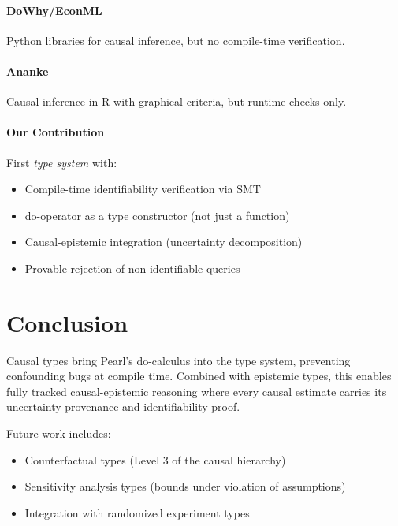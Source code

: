\documentclass[11pt]{article}
\begin{document}
\paragraph{DoWhy/EconML} Python libraries for causal inference, but no compile-time verification.

\paragraph{Ananke} Causal inference in R with graphical criteria, but runtime checks only.

\paragraph{Our Contribution} First \emph{type system} with:
\begin{itemize}
\item Compile-time identifiability verification via SMT
\item do-operator as a type constructor (not just a function)
\item Causal-epistemic integration (uncertainty decomposition)
\item Provable rejection of non-identifiable queries
\end{itemize}

\section{Conclusion}

Causal types bring Pearl's do-calculus into the type system, preventing confounding bugs at compile time. Combined with epistemic types, this enables fully tracked causal-epistemic reasoning where every causal estimate carries its uncertainty provenance and identifiability proof.

Future work includes:
\begin{itemize}
\item Counterfactual types (Level 3 of the causal hierarchy)
\item Sensitivity analysis types (bounds under violation of assumptions)
\item Integration with randomized experiment types
\end{itemize}


\end{document}
